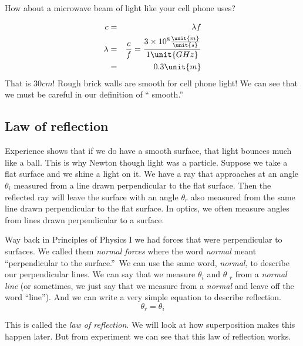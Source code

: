 \documentclass{article}
\begin{document}
How about a microwave beam of light like your cell phone uses?

\begin{eqnarray*}
c &=&\lambda f \\
\lambda &=&\frac{c}{f}=\frac{3\times 10^{8}\frac{\unit{m}}{\unit{s}}}{1\unit{%
GHz}} \\
&=&\allowbreak 0.3\unit{m}
\end{eqnarray*}%
That is $30\unit{cm}!$ Rough brick walls are smooth for cell phone light! We
can see that we must be careful in our definition of \textquotedblleft
smooth.\textquotedblright

\subsection{Law of reflection}

Experience shows that if we do have a smooth surface, that light bounces
much like a ball. This is why Newton though light was a particle. Suppose we
take a flat surface and we shine a light on it. We have a ray that
approaches at an angle $\theta _{i}$ measured from a line drawn
perpendicular to the flat surface. Then the reflected ray will leave the
surface with an angle $\theta _{r}$ also measured from the same line drawn
perpendicular to the flat surface. In optics, we often measure angles from
lines drawn perpendicular to a surface.

Way back in Principles of Physics I we had forces that were perpendicular to
surfaces. We called them \emph{normal forces} where the word \emph{normal}
meant \textquotedblleft perpendicular to the surface.\textquotedblright\ We
can use the same word, \emph{normal,} to describe our perpendicular lines.
We can say that we measure $\theta _{i}$ and $\theta $ $_{r}$ from a \emph{%
normal line} (or sometimes, we just say that we measure from a \emph{normal}
and leave off the word \textquotedblleft line\textquotedblright ). And we
can write a very simple equation to describe reflection. 
\[
\theta _{r}=\theta _{i}
\]

This is called the \emph{law of
reflection}. We will look at how superposition makes this happen later. But
from experiment we can see that this law of reflection works.
\end{document}

